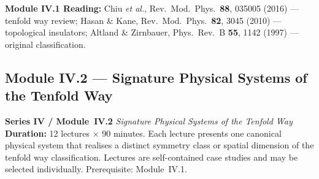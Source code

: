 \documentclass[11pt,a4paper]{article}
\begin{document}
\begin{tcolorbox}[highlightbox]
\textbf{Module IV.1 Reading:} Chiu \textit{et al.}, Rev.\ Mod.\ Phys.\ \textbf{88}, 035005 (2016) --- tenfold way review; Hasan \& Kane, Rev.\ Mod.\ Phys.\ \textbf{82}, 3045 (2010) --- topological insulators; Altland \& Zirnbauer, Phys.\ Rev.\ B \textbf{55}, 1142 (1997) --- original classification.
\end{tcolorbox}

\newpage

\subsection{Module IV.2 --- Signature Physical Systems of the Tenfold Way}
\label{sec:mod-IV2}

\begin{tcolorbox}[seriesbox]
  \textbf{Series IV / Module~IV.2} \quad
  \textit{Signature Physical Systems of the Tenfold Way}\\[4pt]
  \textbf{Duration:} 12 lectures $\times$ 90 minutes.
  Each lecture presents one canonical physical system that realises a
  distinct symmetry class or spatial dimension of the tenfold way
  classification. Lectures are self-contained case studies and may be
  selected individually. Prerequisite: Module~IV.1.
\end{tcolorbox}

\medskip
\end{document}
